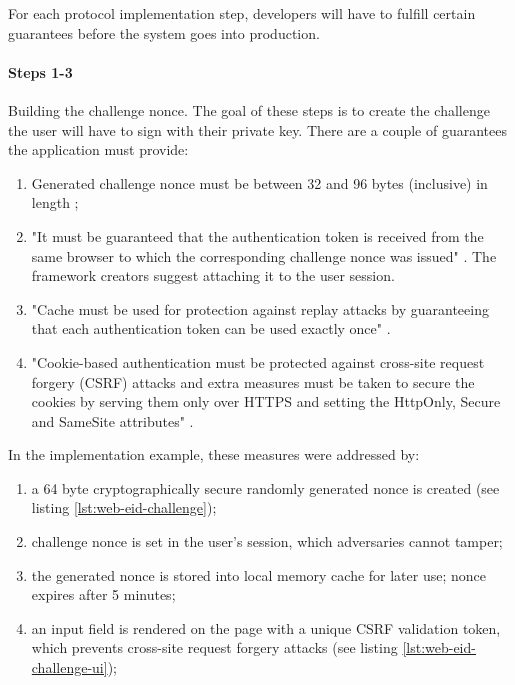 For each protocol implementation step, developers will have to fulfill certain guarantees before the system goes into production.

\paragraph{Steps 1-3}

Building the challenge nonce. The goal of these steps is to create the challenge the user will have to sign with their private key. There are a couple of guarantees the application must provide:
\begin{enumerate}
  \item Generated challenge nonce must be between 32 and 96 bytes (inclusive) in length \cite{ria-webeid-source-web-eid-app-authenticate};
  \item "It must be guaranteed that the authentication token is received from the same browser to which the corresponding challenge nonce was issued" \cite{ria-webeid-source-web-eid-authtoken-validation-java-readme}. The framework creators suggest attaching it to the user session.
  \item "Cache must be used for protection against replay attacks by guaranteeing that each authentication token can be used exactly once" \cite{ria-webeid-source-web-eid-authtoken-validation-java-readme}.
  \item "Cookie-based authentication must be protected against cross-site request forgery (CSRF) attacks and extra measures must be taken to secure the cookies by serving them only over HTTPS and setting the HttpOnly, Secure and SameSite attributes" \cite{ria-webeid-source-web-eid-authtoken-validation-java-readme}.
\end{enumerate}

In the implementation example, these measures were addressed by:
\begin{enumerate}
  \item a 64 byte cryptographically secure randomly generated nonce is created (see listing \ref{lst:web-eid-challenge});
  \item challenge nonce is set in the user's session, which adversaries cannot tamper;
  \item the generated nonce is stored into local memory cache for later use; nonce expires after 5 minutes;
  \item an input field is rendered on the page with a unique CSRF validation token, which prevents cross-site request forgery attacks (see listing \ref{lst:web-eid-challenge-ui});
\end{enumerate}


